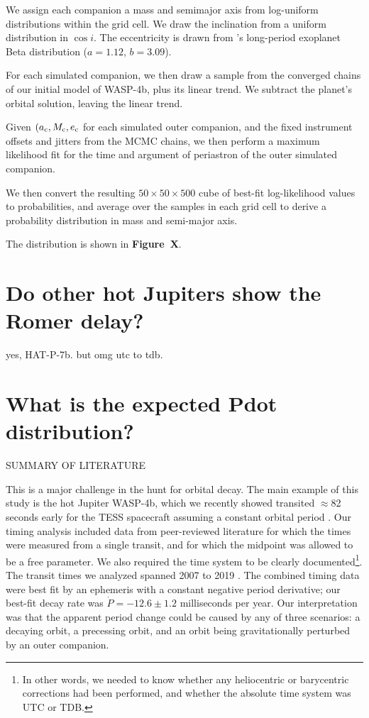 \documentclass[RNAAS]{aastex62}
\begin{document}
We assign each companion a mass and semimajor axis from log-uniform
distributions within the grid cell. We draw the inclination from a uniform
distribution in $\cos i$.  The eccentricity is drawn from
\citet{kipping_beta_2013}'s long-period exoplanet Beta distribution ($a=1.12$,
$b=3.09$).

For each simulated companion, we then draw a sample from the converged chains
of our initial model of WASP-4b, plus its linear trend. We subtract
the planet's orbital solution, leaving the linear trend.

Given $(a_{\rm c}, M_{\rm c}, e_{\rm c}$ for each simulated outer companion,
and the fixed instrument offsets and jitters from the MCMC chains, we then
perform a maximum likelihood fit for the time and argument of periastron of the
outer simulated companion.

We then convert the resulting $50\times50\times500$ cube of best-fit
log-likelihood values to probabilities, and average over the samples in
each grid cell to derive a probability distribution in mass and semi-major
axis.

The distribution is shown in {\bf Figure~X}.


\section{Do other hot Jupiters show the Romer delay?}
yes, HAT-P-7b. but omg utc to tdb.


\section{What is the expected Pdot distribution?}






SUMMARY OF LITERATURE

This is a major challenge in the hunt for orbital decay.  The main
example of this study is the hot Jupiter WASP-4b, which we recently
showed transited $\approx$82 seconds early for the TESS spacecraft
assuming a constant orbital period \citep{bouma_wasp-4b_2019}.  Our
timing analysis included data from peer-reviewed literature for which
the times were measured from a single transit, and for which the
midpoint was allowed to be a free parameter. We also required the time
system to be clearly documented\footnote{In other words, we needed to
know whether any heliocentric or barycentric corrections had been
performed, and whether the absolute time system was UTC or TDB.}. The
transit times we analyzed spanned 2007 to 2019
\citep{wilson_wasp-4b_2008,gillon_improved_2009,winn_transit_2009,dragomir_terms_2011,sanchis-ojeda_starspots_2011,nikolov_wasp-4b_2012,hoyer_tramos_2013,ranjan_atmospheric_2014,huitson_gemini_2017}.
The combined timing data were best fit by an ephemeris with a constant
negative period derivative; our best-fit decay rate was $\dot{P} =
-12.6 \pm 1.2$ milliseconds per year.  Our interpretation was that the
apparent period change could be caused by any of three scenarios: a
decaying orbit, a precessing orbit, and an orbit being gravitationally
perturbed by an outer companion.
\end{document}
